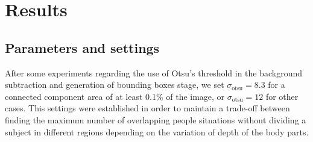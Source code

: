 \documentclass[10pt,twocolumn,letterpaper]{article}
\begin{document}
%
%
%


\section{Results}
\label{ssec:results}

\subsection{Parameters and settings}
\label{ssec:parametersandsettings}

After some experiments regarding the use of Otsu's threshold in the background subtraction and generation of bounding boxes stage, we set $\sigma_\text{otsu} = 8.3$ for a connected component area of at least 0.1\% of the image, or  $\sigma_\text{otsu} = 12$ for other cases. This settings were established in order to maintain a trade-off between finding the maximum number of overlapping people situations without dividing a subject in different regions depending on the variation of depth of the body parts.
\end{document}
